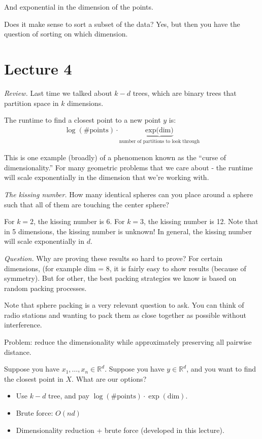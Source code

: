 \documentclass[12pt]{article}
\newcommand{\RR}{\mathbb{R}}
\begin{document}
And exponential in the dimension of the points.

Does it make sense to sort a subset of the data?  Yes, but then you have the question of sorting on which dimension.

\section{Lecture 4}

{\it Review.} Last time we talked about $k-d$ trees, which are binary trees that partition space in $k$ dimensions.

The runtime to find a closest point to a new point $y$ is:
\begin{align*}
  \log (\text{\# points}) \cdot \underbrace{\text{exp(dim)}}_{\text{number of partitions to look through}}
\end{align*}

This is one example (broadly) of a phenomenon known as the ``curse of dimensionality.''  For many geometric problems that we care about - the runtime will scale exponentially in the dimension that we're working with.

{\it The kissing number.} How many identical spheres can you place around a sphere such that all of them are touching the center sphere?

For $k=2$, the kissing number is 6.  For $k=3$, the kissing number is 12.  Note that in 5 dimensions, the kissing number is unknown!  In general, the kissing number will scale exponentially in $d$.

{\it Question.} Why are proving these results so hard to prove?  For certain dimensions, (for example dim = 8, it is fairly easy to show results (because of symmetry).  But for other, the best packing strategies we know is based on random packing processes.

Note that sphere packing is a very relevant question to ask.  You can think of radio stations and wanting to pack them as close together as possible without interference.

Problem: reduce the dimensionality while approximately preserving all pairwise distance.

Suppose you have $x_1, \dots, x_n \in \RR^d$.  Suppose you have $y \in \RR^d$, and you want to find the closest point in $X$.  What are our options?

\begin{itemize}
  \item Use $k-d$ tree, and pay $\log (\text{\# points}) \cdot \exp(\text{dim})$.
  \item Brute force: $O(nd)$
  \item Dimensionality reduction + brute force (developed in this lecture).
\end{itemize}
\end{document}
